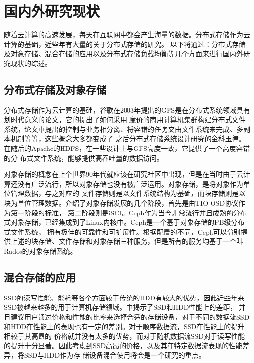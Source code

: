 
\chapter{国内外研究现状}
\label{chap:relatedwork}
随着云计算的高速发展，每天在互联网中都会产生海量的数据。分布式存储作为云计算的基础，近些年有大量的关于分布式存储的研究。
以下将通过：分布式存储及对象存储、混合存储的应用以及分布式存储负载均衡等几个方面来进行国内外研究现状的综述。

\section{分布式存储及对象存储}
分布式存储作为云计算的基础，谷歌在2003年提出的GFS\cite{ghemawat2003google}是在分布式系统领域具有划时代意义的论文，它的提出了如何采用
廉价的商用计算机集群构建分布式文件系统，论文中提出的控制与业务相分离、将容错的任务交由文件系统来完成、多副本机制等等，这些概念大多都变成了
之后分布式存储系统设计研究的金科玉律。在随后的Apache的HDFS\cite{shvachko2010hadoop}，在一些设计上与GFS高度一致，它提供了一个高度容错的分
布式文件系统，能够提供高吞吐量的数据访问。

对象存储的概念在上个世界90年代就应该在研究社区中出现，但是在当时由于云计算还没有广泛流行，所以对象存储也没有被广泛运用。对象存储，是将对象作为单位管理数据，与之对应的
文件存储则是以文件系统结构为基础，而块存储则是以块为单位管理数据。介绍了对象存储发展的几个阶段，首先是由TIO OSD协议作为第一阶段的标准，
第二阶段则是iSCI。Ceph作为当今非常流行并且成熟的分布式对象存储，已经集成到了Linux内核中。Ceph是一个基于对象存储的PB级分布式文件系统，
拥有极佳的可靠性和可扩展性。根据配置的不同，Ceph可以分别提供上述的块存储、文件存储和对象存储三种服务，但是所有的服务均基于一个叫Rados的对象存储系统。

\section{混合存储的应用}
SSD的读写性能、能耗等各个方面较于传统的HDD有较大的优势，因此近些年来SSD被越来越多的用于计算机存储领域。中揭示了SSD和HDD性能上的差距，
并且建议用户通过价格和性能的比率来选择合适的存储设备，对于不同的数据流SSD和HDD在性能上的表现也有一定的差别。对于顺序数据流，SSD在性能上的提升相较于其高昂的
价格就并没有太多的优势，而对于随机数据流SSD对于读写性能的提升十分显著。因此考虑到SSD高昂的价格，以及其在特定数据流表现的性能差异，将SSD与HDD作为存
储设备混合使用将会是一个研究的重点。

